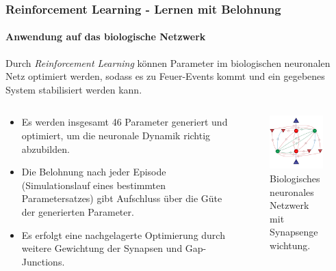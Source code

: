 \documentclass[10pt,t,aspectratio=1610]{beamer}
\newcommand{\ChapterRl}{Reinforcement Learning - Lernen mit Belohnung}
\begin{document}
\begin{frame}
	\frametitle{\ChapterRl}
	\framesubtitle{Anwendung auf das biologische Netzwerk}
	\vspace{0.3cm}
	Durch \textit{Reinforcement Learning} können Parameter im biologischen neuronalen Netz optimiert werden, sodass es zu Feuer-Events kommt und ein gegebenes System stabilisiert werden kann.
	\vspace{0.2cm}
	\begin{columns}[T,onlytextwidth]
		\begin{column}{0.5\textwidth}
			\begin{itemize}
				\item Es werden insgesamt 46 Parameter generiert und optimiert, um die neuronale Dynamik richtig abzubilden.
				\item Die Belohnung nach jeder Episode (Simulationslauf eines bestimmten Parametersatzes) gibt Aufschluss über die Güte der generierten Parameter.
				\item Es erfolgt eine nachgelagerte Optimierung durch weitere Gewichtung der Synapsen und Gap-Junctions.
			\end{itemize}
		\end{column}
		\hspace{1cm}
		\begin{column}{0.45\textwidth}
			\vspace{-0.5cm}
			\begin{figure}[H] %
				\centering
				\includegraphics[width=5cm]{figures/Neural_Net_v3_num_syn.pdf}
				\caption{Biologisches neuronales Netzwerk mit Synapsengewichtung.}
				\label{fig:bnn_num}
			\end{figure}
		\end{column}
	\end{columns}
\end{frame}

\end{document}
